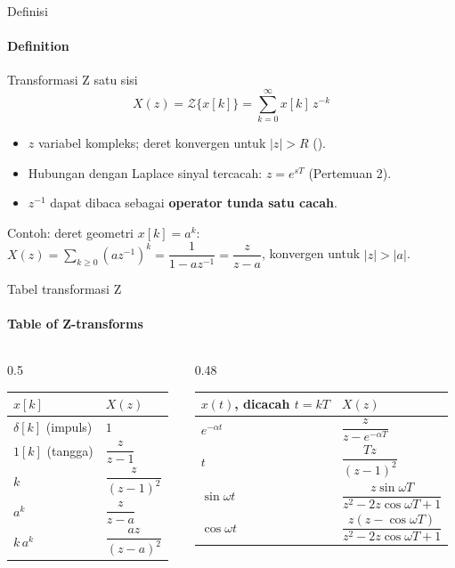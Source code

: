 \documentclass[aspectratio=169,10pt]{beamer}
\begin{document}
\begin{frame}{Definisi}
	\framesubtitle{Definition}
	\begin{block}{Transformasi Z satu sisi}
		\[
			X(z) = \mathcal{Z}\{x[k]\} = \sum_{k=0}^{\infty} x[k]\,z^{-k}
		\]
	\end{block}
	\begin{itemize}
		\item $z$ variabel kompleks; deret konvergen untuk $|z| > R$ ().
		\item Hubungan dengan Laplace sinyal tercacah: $z = e^{sT}$ (Pertemuan 2).
		\item $z^{-1}$ dapat dibaca sebagai \textbf{operator tunda satu cacah}.
	\end{itemize}
	\vspace{0.1cm}
	\begin{exampleblock}{Contoh: deret geometri}
		\small
		$x[k] = a^k$: \quad $X(z) = \sum_{k\ge0} (az^{-1})^k = \dfrac{1}{1-az^{-1}} = \dfrac{z}{z-a}$, \quad konvergen untuk $|z|>|a|$.
	\end{exampleblock}
\end{frame}

\begin{frame}{Tabel transformasi Z}
	\framesubtitle{Table of Z-transforms}
	\small
	\renewcommand{\arraystretch}{2.4}
	\begin{columns}[T]
		\begin{column}{0.5\textwidth}
			\begin{tabular}{@{}l l@{}}
				\toprule
				$x[k]$ & $X(z)$ \\
				\midrule
				$\delta[k]$ (impuls) & $1$ \\
				$1[k]$ (tangga) & $\dfrac{z}{z-1}$ \\
				$k$ & $\dfrac{z}{(z-1)^2}$ \\
				$a^k$ & $\dfrac{z}{z-a}$ \\
				$k\,a^{k}$ & $\dfrac{az}{(z-a)^2}$ \\
				\bottomrule
			\end{tabular}
		\end{column}
		\begin{column}{0.48\textwidth}
			\begin{tabular}{@{}l l@{}}
				\toprule
				$x(t)$, dicacah $t=kT$ & $X(z)$ \\
				\midrule
				$e^{-\alpha t}$ & $\dfrac{z}{z-e^{-\alpha T}}$ \\
				$t$ & $\dfrac{Tz}{(z-1)^2}$ \\
				$\sin\omega t$ & $\dfrac{z\sin\omega T}{z^2-2z\cos\omega T+1}$ \\
				$\cos\omega t$ & $\dfrac{z(z-\cos\omega T)}{z^2-2z\cos\omega T+1}$ \\
				\bottomrule
			\end{tabular}
		\end{column}
	\end{columns}
\end{frame}
\end{document}
